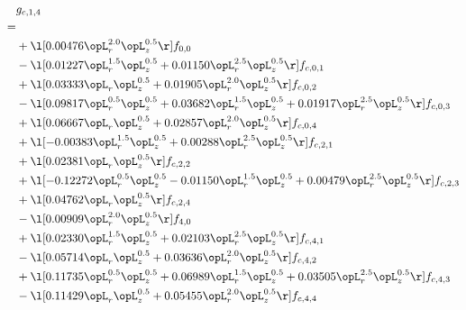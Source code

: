 \begin{alignat}{2} 
\label{eq:g_14_0} 
& g_{c,1,4} \nonumber \\ 
 = \\ 
& + \l[  0.00476 \opL_r^{2.0} \opL_z^{0.5}  \r] f_{0,0} \nonumber \\ 
& - \l[  0.01227 \opL_r^{1.5} \opL_z^{0.5} +  0.01150 \opL_r^{2.5} \opL_z^{0.5}  \r] f_{c,0,1} \nonumber \\ 
& + \l[  0.03333 \opL_r \opL_z^{0.5} +  0.01905 \opL_r^{2.0} \opL_z^{0.5}  \r] f_{c,0,2} \nonumber \\ 
& - \l[  0.09817 \opL_r^{0.5} \opL_z^{0.5} +  0.03682 \opL_r^{1.5} \opL_z^{0.5} +  0.01917 \opL_r^{2.5} \opL_z^{0.5}  \r] f_{c,0,3} \nonumber \\ 
& + \l[  0.06667 \opL_r \opL_z^{0.5} +  0.02857 \opL_r^{2.0} \opL_z^{0.5}  \r] f_{c,0,4} \nonumber \\ 
& + \l[  -0.00383 \opL_r^{1.5} \opL_z^{0.5} +  0.00288 \opL_r^{2.5} \opL_z^{0.5}  \r] f_{c,2,1} \nonumber \\ 
& + \l[  0.02381 \opL_r \opL_z^{0.5}  \r] f_{c,2,2} \nonumber \\ 
& + \l[  -0.12272 \opL_r^{0.5} \opL_z^{0.5}   -0.01150 \opL_r^{1.5} \opL_z^{0.5} +  0.00479 \opL_r^{2.5} \opL_z^{0.5}  \r] f_{c,2,3} \nonumber \\ 
& + \l[  0.04762 \opL_r \opL_z^{0.5}  \r] f_{c,2,4} \nonumber \\ 
& - \l[  0.00909 \opL_r^{2.0} \opL_z^{0.5}  \r] f_{4,0} \nonumber \\ 
& + \l[  0.02330 \opL_r^{1.5} \opL_z^{0.5} +  0.02103 \opL_r^{2.5} \opL_z^{0.5}  \r] f_{c,4,1} \nonumber \\ 
& - \l[  0.05714 \opL_r \opL_z^{0.5} +  0.03636 \opL_r^{2.0} \opL_z^{0.5}  \r] f_{c,4,2} \nonumber \\ 
& + \l[  0.11735 \opL_r^{0.5} \opL_z^{0.5} +  0.06989 \opL_r^{1.5} \opL_z^{0.5} +  0.03505 \opL_r^{2.5} \opL_z^{0.5}  \r] f_{c,4,3} \nonumber \\ 
& - \l[  0.11429 \opL_r \opL_z^{0.5} +  0.05455 \opL_r^{2.0} \opL_z^{0.5}  \r] f_{c,4,4} \nonumber \\ 
\end{alignat} 


